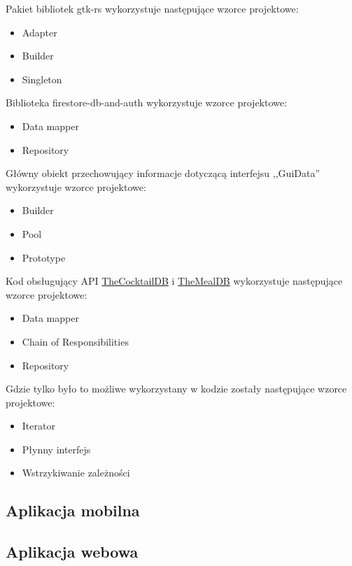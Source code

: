 \documentclass[12pt,a4paper]{article}
\begin{document}
			\indent Pakiet bibliotek gtk-rs wykorzystuje następujące wzorce projektowe:
			\begin{itemize}
				\item Adapter
				\item Builder
				\item Singleton								 
			\end{itemize}

			\indent Biblioteka firestore-db-and-auth wykorzystuje wzorce projektowe:
			\begin{itemize}
				\item Data mapper
				\item Repository
			\end{itemize}
			Główny obiekt przechowujący informacje dotyczącą interfejsu ,,GuiData'' wykorzystuje wzorce projektowe:
			\begin{itemize}
				\item Builder
				\item Pool
				\item Prototype
			\end{itemize}

			\indent Kod obsługujący API \href{https://www.thecocktaildb.com/api.php}{TheCocktailDB} i \href{https://www.themealdb.com/api.php}{TheMealDB}
			wykorzystuje następujące wzorce projektowe:
			\begin{itemize}
				\item Data mapper
				\item Chain of Responsibilities
				\item Repository
			\end{itemize}

			\indent Gdzie tylko było to możliwe wykorzystany w kodzie zostały następujące wzorce projektowe:
			\begin{itemize}
			\item Iterator
			\item Płynny interfejs
			\item Wstrzykiwanie zależności
			\end{itemize}			 
		\subsection{Aplikacja mobilna}
		\subsection{Aplikacja webowa}	 
	\newpage
	
\end{document}
